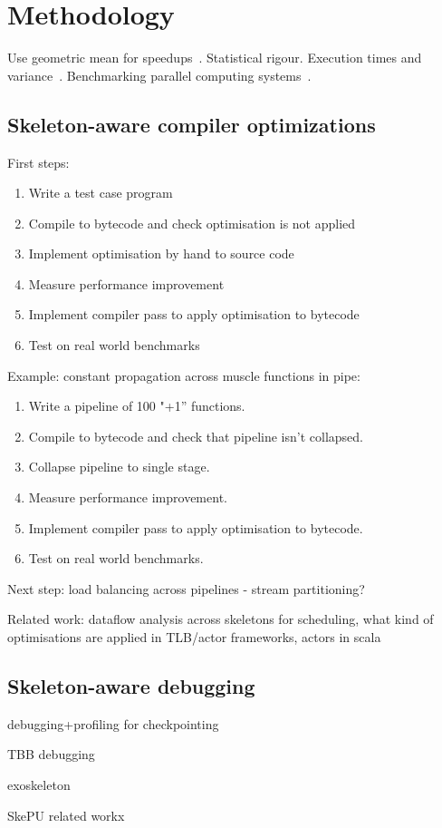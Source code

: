 \section{Methodology}

Use geometric mean for speedups~\cite{Fleming1986}. Statistical
rigour\cite{Georges2007}. Execution times and
variance~\cite{Box}. Benchmarking parallel computing
systems~\cite{Belli2015}.


\subsection{Skeleton-aware compiler optimizations}

First steps:
%
\begin{enumerate}
  \item Write a test case program
  \item Compile to bytecode and check optimisation is not applied
  \item Implement optimisation by hand to source code
  \item Measure performance improvement
  \item Implement compiler pass to apply optimisation to bytecode
  \item Test on real world benchmarks
\end{enumerate}
%
Example: constant propagation across muscle functions in pipe:
%
\begin{enumerate}
  \item Write a pipeline of 100 "+1” functions.
  \item Compile to bytecode and check that pipeline isn’t collapsed.
  \item Collapse pipeline to single stage.
  \item Measure performance improvement.
  \item Implement compiler pass to apply optimisation to bytecode.
  \item Test on real world benchmarks.
\end{enumerate}
%
Next step: load balancing across pipelines - stream partitioning?

Related work: dataflow analysis across skeletons for scheduling, what
kind of optimisations are applied in TLB/actor frameworks, actors in
scala


\subsection{Skeleton-aware debugging}
debugging+profiling for checkpointing

TBB debugging

exoskeleton

SkePU related workx
